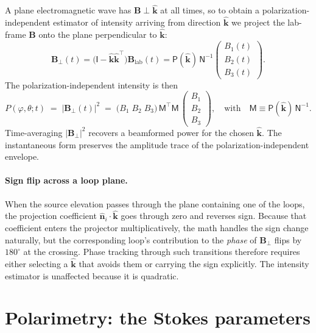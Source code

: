 \documentclass[11pt]{article}
\begin{document}
A plane electromagnetic wave has $\mathbf{B}\perp\hat{\mathbf k}$ at all
times, so to obtain a polarization-independent estimator of intensity
arriving from direction $\hat{\mathbf k}$ we project the lab-frame
$\mathbf B$ onto the plane perpendicular to $\hat{\mathbf k}$:
\begin{equation}
\mathbf{B}_{\!\perp}(t)
   = \bigl(\mathsf{I} - \hat{\mathbf k}\hat{\mathbf k}^{\!\top}\bigr)
     \mathbf{B}_{\mathrm{lab}}(t)
   = \mathsf{P}(\hat{\mathbf k})\,\mathsf{N}^{-1}
     \begin{pmatrix} B_1(t)\\ B_2(t)\\ B_3(t) \end{pmatrix}.
\label{eq:Bperp}
\end{equation}
The polarization-independent intensity is then
\begin{equation}
P(\varphi,\theta;t) \;=\; |\mathbf{B}_\perp(t)|^2
   \;=\; \bigl(B_1\;B_2\;B_3\bigr)\,\mathsf{M}^{\!\top}\mathsf{M}\,
         \begin{pmatrix} B_1\\ B_2\\ B_3\end{pmatrix},
\quad\text{with}\quad
\mathsf{M} \equiv \mathsf{P}(\hat{\mathbf k})\,\mathsf{N}^{-1}.
\label{eq:intensity}
\end{equation}
Time-averaging $|\mathbf B_\perp|^2$ recovers a beamformed power for
the chosen $\hat{\mathbf k}$.  The instantaneous form preserves the
amplitude trace of the polarization-independent envelope.

\paragraph{Sign flip across a loop plane.}
When the source elevation passes through the plane containing one of
the loops, the projection coefficient $\hat{\mathbf n}_i\!\cdot\!\hat{\mathbf k}$
goes through zero and reverses sign.  Because that coefficient enters
the projector multiplicatively, the math handles the sign change
naturally, but the corresponding loop's contribution to the
\emph{phase} of $\mathbf B_\perp$ flips by $180^\circ$ at the crossing.
Phase tracking through such transitions therefore requires either
selecting a $\hat{\mathbf k}$ that avoids them or carrying the sign
explicitly.  The intensity estimator is unaffected because it is
quadratic.

\section{Polarimetry: the Stokes parameters}
\end{document}
